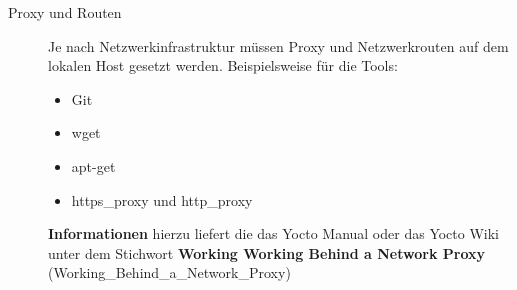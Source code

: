 \begin{description}
    \item[Proxy und Routen]
    Je nach Netzwerkinfrastruktur müssen Proxy und Netzwerkrouten auf
    dem lokalen Host gesetzt werden. Beispielsweise für die Tools:
        \begin{itemize}
            \item Git
            \item wget
            \item apt-get
            \item https\_proxy und http\_proxy
        \end{itemize}
        \textbf{Informationen} hierzu liefert die das Yocto Manual oder das
            Yocto Wiki unter dem Stichwort \glqq \textbf{Working Working Behind
            a Network Proxy} \grqq (Working\_Behind\_a\_Network\_Proxy)

\end{description}

